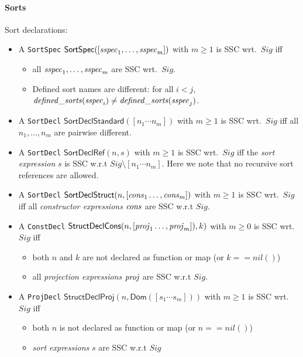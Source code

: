 \documentclass[fleqn,a4paper]{article}
\newcommand{\aterm}[1]{\mathsf{#1}}
\begin{document}
\paragraph{Sorts}
Sort declarations:
\begin{itemize}
\item
  A {\tt SortSpec}
  $\aterm{SortSpec}([\nm{sspec}_1,\dots,\nm{sspec}_m])$ with $m\geq 1$
  is SSC wrt.\ $Sig$ iff
  \begin{itemize}
  \item all $\mathit{sspec}_1,\dots,\mathit{sspec}_m$ are SSC wrt.\ $Sig$.
  \item Defined sort names are different: for all $i<j$, $\mathit{defined\_sorts}(\mathit{sspec}_i)\neq\mathit{defined\_sorts}(\mathit{sspec}_j)$.
  \end{itemize}
\item
  A {\tt SortDecl}
  $\aterm{SortDeclStandard}([n_1\cdots n_m])$ with $m\geq 1$
  is SSC wrt.\ $Sig$ iff all $n_1,\ldots,n_m$ are pairwise
  different.
\item
  A {\tt SortDecl}
  $\aterm{SortDeclRef}(n,s)$ with $m\geq 1$
  is SSC wrt.\ $Sig$ iff the \emph{sort expression} $s$ is SSC w.r.t $Sig\setminus [n_1\cdots n_m]$.
  Here we note that no recursive sort references are allowed.
\item
  A {\tt SortDecl}
  $\aterm{SortDeclStruct}(n,[\nm{cons}_1\dots,\nm{cons}_m])$ with $m\geq 1$
  is SSC wrt.\ $Sig$ iff all \emph{constructor expressions} $\mathit{cons}$ are SSC w.r.t $Sig$.
\item
  A {\tt ConstDecl}
  $\aterm{StructDeclCons}(n,[\nm{proj}_1\dots,\nm{proj}_m]),k)$ with $m\geq 0$
  is SSC wrt.\ $Sig$ iff
  \begin{itemize}
  \item both $n$ and $k$ are not declared as function or map (or $k==nil()$)
  \item all \emph{projection expressions} $\mathit{proj}$ are SSC w.r.t $Sig$.
  \end{itemize}
\item
  A {\tt ProjDecl}
  $\aterm{StructDeclProj}(n,\aterm{Dom}([s_1\cdots s_m]))$ with $m\geq 1$
  is SSC wrt.\ $Sig$ iff
  \begin{itemize}
  \item both $n$ is not declared as function or map (or $n==nil()$)
  \item \emph{sort expressions} $s$ are SSC w.r.t $Sig$
  \end{itemize}
\end{itemize}
\end{document}
